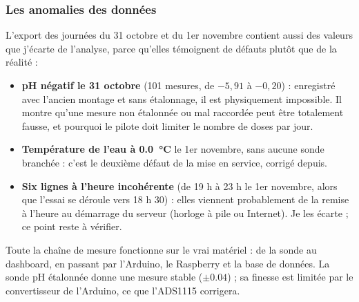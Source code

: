 \subsubsection*{Les anomalies des données}

L'export des journées du 31 octobre et du 1er novembre contient aussi des valeurs que j'écarte de l'analyse, parce qu'elles témoignent de défauts plutôt que de la réalité :

\begin{itemize}
\item \textbf{pH négatif le 31 octobre} (101 mesures, de $-5{,}91$ à $-0{,}20$) : enregistré avec l'ancien montage et sans étalonnage, il est physiquement impossible. Il montre qu'une mesure non étalonnée ou mal raccordée peut être totalement fausse, et pourquoi le pilote doit limiter le nombre de doses par jour.
\item \textbf{Température de l'eau à \qty{0,0}{\celsius}} le 1er novembre, sans aucune sonde branchée : c'est le deuxième défaut de la mise en service, corrigé depuis.
\item \textbf{Six lignes à l'heure incohérente} (de 19 h à 23 h le 1er novembre, alors que l'essai se déroule vers 18 h 30) : elles viennent probablement de la remise à l'heure au démarrage du serveur (horloge à pile ou Internet). Je les écarte ; ce point reste à vérifier.
\end{itemize}

\begin{aretenir}
Toute la chaîne de mesure fonctionne sur le vrai matériel : de la sonde au dashboard, en passant par l'Arduino, le Raspberry et la base de données. La sonde pH étalonnée donne une mesure stable ($\pm\num{0,04}$) ; sa finesse est limitée par le convertisseur de l'Arduino, ce que l'ADS1115 corrigera.
\end{aretenir}

